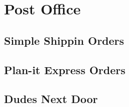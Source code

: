 \chapter{Post Office}
    \section{Simple Shippin Orders}

    \section{Plan-it Express Orders}

    \section{Dudes Next Door}
